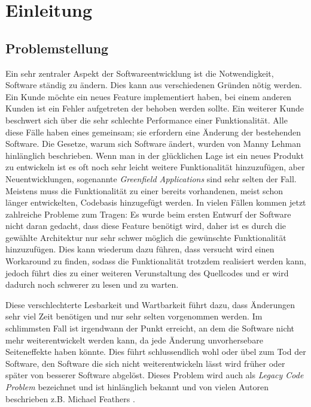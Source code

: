 \chapter{Einleitung}
\label{cha:Einleitung}

\section{Problemstellung}
\label{cha:Problemstellung}
Ein sehr zentraler Aspekt der Softwareentwicklung ist die Notwendigkeit, Software ständig zu ändern. Dies kann aus verschiedenen Gründen nötig werden. Ein Kunde möchte ein neues Feature implementiert haben, bei einem anderen Kunden ist ein Fehler aufgetreten der behoben werden sollte. Ein weiterer Kunde beschwert sich über die sehr schlechte Performance einer Funktionalität. Alle diese Fälle haben eines gemeinsam; sie erfordern eine Änderung der bestehenden Software. Die Gesetze, warum sich Software ändert, wurden von Manny Lehman \cite{Lehmann1980} hinlänglich beschrieben. Wenn man in der glücklichen Lage ist ein neues Produkt zu entwickeln ist es oft noch sehr leicht weitere Funktionalität hinzuzufügen, aber Neuentwicklungen, sogenannte \textit{ Greenfield Applications} sind sehr selten der Fall. Meistens muss die Funktionalität zu einer bereits vorhandenen, meist schon länger entwickelten, Codebasis hinzugefügt werden. In vielen Fällen kommen jetzt zahlreiche Probleme zum Tragen: Es wurde beim ersten Entwurf der Software nicht daran gedacht, dass diese Feature benötigt wird, daher ist es durch die gewählte Architektur nur sehr schwer möglich die gewünschte Funktionalität hinzuzufügen. Dies kann wiederum dazu führen, dass versucht wird einen Workaround zu finden, sodass die Funktionalität trotzdem realisiert werden kann, jedoch führt dies zu einer weiteren Verunstaltung des Quellcodes und er wird dadurch noch schwerer zu lesen und zu warten. 

Diese verschlechterte Lesbarkeit und Wartbarkeit führt dazu, dass Änderungen sehr viel Zeit benötigen und nur sehr selten vorgenommen werden. Im schlimmsten Fall ist irgendwann der Punkt erreicht, an dem die Software nicht mehr weiterentwickelt werden kann, da jede Änderung unvorhersebare Seiteneffekte haben könnte. Dies führt schlussendlich wohl oder übel zum Tod der Software, den Software die sich nicht weiterentwickeln lässt wird früher oder später von besserer Software abgelöst. Dieses Problem wird auch als \textit{Legacy Code Problem} bezeichnet und ist hinlänglich bekannt und von vielen Autoren beschrieben z.B. Michael Feathers \cite{Feathers2013}.

